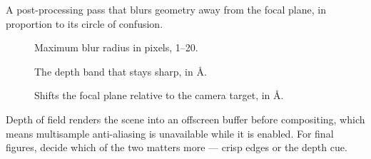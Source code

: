A post-processing pass that blurs geometry away from the focal plane, in
proportion to its circle of confusion.

\begin{description}
  \item[] Maximum blur radius in pixels, 1--20.
  \item[] The depth band that stays sharp, in \AA{}.
  \item[] Shifts the focal plane relative to the camera
    target, in \AA{}.
\end{description}

\begin{calnote}
Depth of field renders the scene into an offscreen buffer before
compositing, which means multisample anti-aliasing is unavailable while it
is enabled. For final figures, decide which of the two matters more ---
crisp edges or the depth cue.
\end{calnote}
